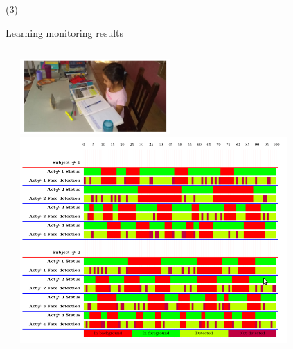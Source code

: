 \begin{frame}{ (3)}
\begin{block}{Learning monitoring results}
\begin{columns}
\begin{column}{0.5\textwidth}
\end{column}
\begin{column}{0.5\textwidth}  
    \begin{center}
          \includegraphics[width=0.45\textwidth]{Figs/LearningMonitoring3}
     \includegraphics[width=0.80\textwidth]{Figs/LearningMonitoring4}

     \end{center}
\end{column}
\end{columns}

\end{block} 
\end{frame}

